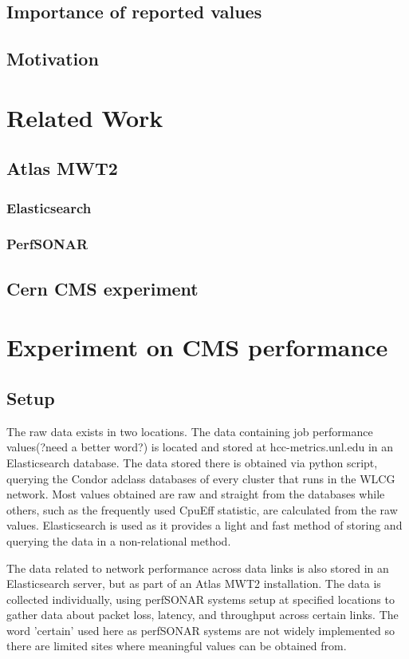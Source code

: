 \documentclass[]{scrartcl}
\begin{document}
\subsection{Importance of reported values}
\subsection{Motivation}

\section{Related Work}
\subsection{Atlas MWT2}
\subsubsection{Elasticsearch}
\subsubsection{PerfSONAR}
\subsection{Cern CMS experiment}

\section{Experiment on CMS performance}
\subsection{Setup}
The raw data exists in two locations. The data containing job performance values(?need a better word?) is located and stored at hcc-metrics.unl.edu in an Elasticsearch database. The data stored there is obtained via python script, querying the Condor adclass databases of every cluster that runs in the WLCG network. Most values obtained are raw and straight from the databases while others, such as the frequently used CpuEff statistic, are calculated from the raw values. Elasticsearch is used as it provides a light and fast method of storing and querying the data in a non-relational method.

The data related to network performance across data links is also stored in an Elasticsearch server, but as part of an Atlas MWT2 installation. The data is collected individually, using perfSONAR systems setup at specified locations to gather data about packet loss, latency, and throughput across certain links. The word 'certain' used here as perfSONAR systems are not widely implemented so there are limited sites where meaningful values can be obtained from.
\end{document}
